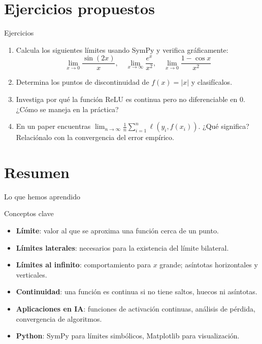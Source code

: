 \documentclass[aspectratio=169, 10pt, xcolor=table]{beamer}
\begin{document}
\section{Ejercicios propuestos}

\begin{frame}{Ejercicios}
    \begin{enumerate}
        \item Calcula los siguientes límites usando SymPy y verifica gráficamente:
        \[
        \lim_{x\to 0} \frac{\sin(2x)}{x},\quad
        \lim_{x\to\infty} \frac{e^x}{x^2},\quad
        \lim_{x\to 0} \frac{1-\cos x}{x^2}
        \]
        \item Determina los puntos de discontinuidad de $f(x)=|x|$ y clasifícalos.
        \item Investiga por qué la función ReLU es continua pero no diferenciable en 0. ¿Cómo se maneja en la práctica?
        \item En un paper encuentras $\displaystyle \lim_{n\to\infty} \frac{1}{n}\sum_{i=1}^n \ell(y_i, f(x_i))$. ¿Qué significa? Relaciónalo con la convergencia del error empírico.
    \end{enumerate}
\end{frame}

\section{Resumen}

\begin{frame}{Lo que hemos aprendido}
    \begin{exampleblock}{Conceptos clave}
        \begin{itemize}
            \item \textbf{Límite}: valor al que se aproxima una función cerca de un punto.
            \item \textbf{Límites laterales}: necesarios para la existencia del límite bilateral.
            \item \textbf{Límites al infinito}: comportamiento para $x$ grande; asíntotas horizontales y verticales.
            \item \textbf{Continuidad}: una función es continua si no tiene saltos, huecos ni asíntotas.
            \item \textbf{Aplicaciones en IA}: funciones de activación continuas, análisis de pérdida, convergencia de algoritmos.
            \item \textbf{Python}: SymPy para límites simbólicos, Matplotlib para visualización.
        \end{itemize}
    \end{exampleblock}
\end{frame}
\end{document}
